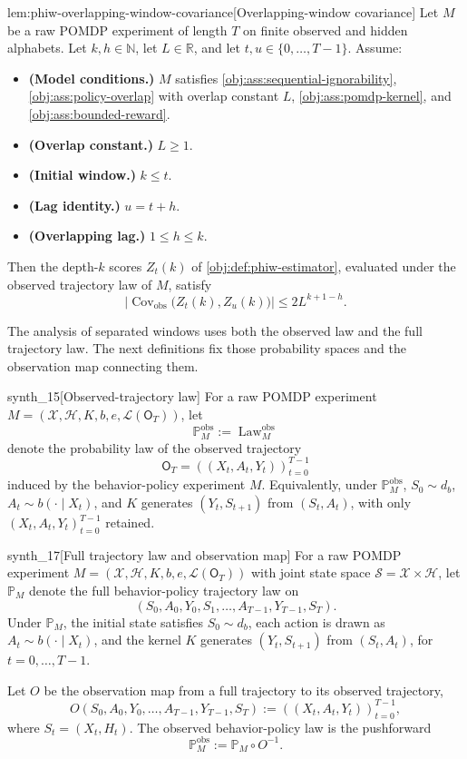 \begin{lemmav}{lem:phiw-overlapping-window-covariance}[Overlapping-window covariance]
Let \(M\) be a raw POMDP experiment of length \(T\) on finite observed and hidden alphabets. Let \(k,h\in\mathbb N\), let \(L\in\mathbb R\), and let \(t,u\in\{0,\ldots,T-1\}\). Assume:
\begin{itemize}
\item \textbf{(Model conditions.)} \(M\) satisfies \cref{obj:ass:sequential-ignorability}, \cref{obj:ass:policy-overlap} with overlap constant \(L\), \cref{obj:ass:pomdp-kernel}, and \cref{obj:ass:bounded-reward}.
\item \textbf{(Overlap constant.)} \(L\ge 1\).
\item \textbf{(Initial window.)} \(k\le t\).
\item \textbf{(Lag identity.)} \(u=t+h\).
\item \textbf{(Overlapping lag.)} \(1\le h\le k\).
\end{itemize}
Then the depth-\(k\) scores \(Z_t(k)\) of \cref{obj:def:phiw-estimator}, evaluated under the observed trajectory law of \(M\), satisfy
\[
\bigl|\operatorname{Cov}_{\mathrm{obs}}\bigl(Z_t(k),Z_u(k)\bigr)\bigr|
\le
2L^{k+1-h}.
\]
\end{lemmav}

The analysis of separated windows uses both the observed law and the full trajectory law. The next definitions fix those probability spaces and the observation map connecting them.

\begin{definitionv}{synth_15}[Observed-trajectory law]
For a raw POMDP experiment \(M=(\mathcal X,\mathcal H,K,b,e,\mathcal L(\mathsf O_T))\), let
\[
\mathbb P_M^{\mathrm{obs}}:=\operatorname{Law}^{\mathrm{obs}}_M
\]
denote the probability law of the observed trajectory
\[
\mathsf O_T=((X_t,A_t,Y_t))_{t=0}^{T-1}
\]
induced by the behavior-policy experiment \(M\). Equivalently, under \(\mathbb P_M^{\mathrm{obs}}\), \(S_0\sim d_b\), \(A_t\sim b(\cdot\mid X_t)\), and \(K\) generates \((Y_t,S_{t+1})\) from \((S_t,A_t)\), with only \((X_t,A_t,Y_t)_{t=0}^{T-1}\) retained.
\end{definitionv}

\begin{definitionv}{synth_17}[Full trajectory law and observation map]
For a raw POMDP experiment \(M=(\mathcal X,\mathcal H,K,b,e,\mathcal L(\mathsf O_T))\) with joint state space \(\mathcal S=\mathcal X\times\mathcal H\), let \(\mathbb P_M\) denote the full behavior-policy trajectory law on
\[
(S_0,A_0,Y_0,S_1,\ldots,A_{T-1},Y_{T-1},S_T).
\]
Under \(\mathbb P_M\), the initial state satisfies \(S_0\sim d_b\), each action is drawn as \(A_t\sim b(\cdot\mid X_t)\), and the kernel \(K\) generates \((Y_t,S_{t+1})\) from \((S_t,A_t)\), for \(t=0,\ldots,T-1\).

Let \(O\) be the observation map from a full trajectory to its observed trajectory,
\[
O(S_0,A_0,Y_0,\ldots,A_{T-1},Y_{T-1},S_T)
:=((X_t,A_t,Y_t))_{t=0}^{T-1},
\]
where \(S_t=(X_t,H_t)\). The observed behavior-policy law is the pushforward
\[
\mathbb P_M^{\mathrm{obs}}:=\mathbb P_M\circ O^{-1}.
\]
\end{definitionv}

